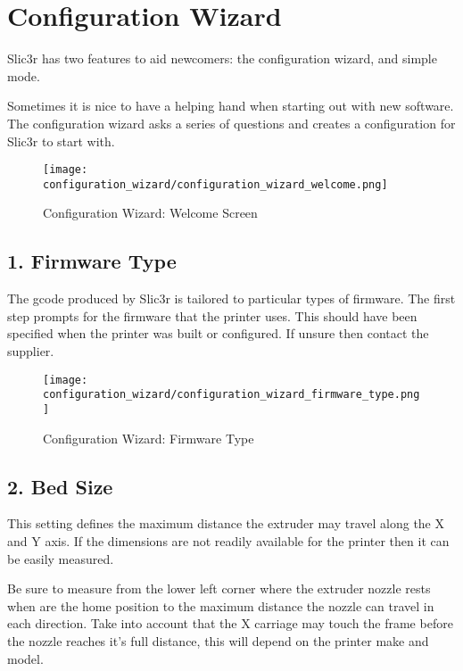 
\section{Configuration Wizard}
\label{sec:configuration_wizard}

Slic3r has two features to aid newcomers: the configuration wizard, and simple mode.

Sometimes it is nice to have a helping hand when starting out with new software.  The configuration wizard asks a series of questions and creates a configuration for Slic3r to start with.

\begin{figure}[H]
\centering
\texttt{[image: configuration\_wizard/configuration\_wizard\_welcome.png]}
\caption{Configuration Wizard: Welcome Screen}
\label{fig:configuration_wizard_welcome_screen}
\end{figure}

\newpage
\subsection{1. Firmware Type}
\label{sub:1_firmware_type}
The gcode produced by Slic3r is tailored to particular types of firmware.  The first step prompts for the firmware that the printer uses.  This should have been specified when the printer was built or configured.  If unsure then contact the supplier.
\begin{figure}[H]
\centering
\texttt{[image: configuration\_wizard/configuration\_wizard\_firmware\_type.png]}
\caption{Configuration Wizard: Firmware Type}
\label{fig:configuration_wizard_firmware_type}
\end{figure}

\newpage
\subsection{2. Bed Size}
\label{sub:2_bed_size}
This setting defines the maximum distance the extruder may travel along the X and Y axis.  If the dimensions are not readily available for the printer then it can be easily measured.  

Be sure to measure from the lower left corner where the extruder nozzle rests when are the home position to the maximum distance the nozzle can travel in each direction.  Take into account that the X carriage may touch the frame before the nozzle reaches it's full distance, this will depend on the printer make and model.

